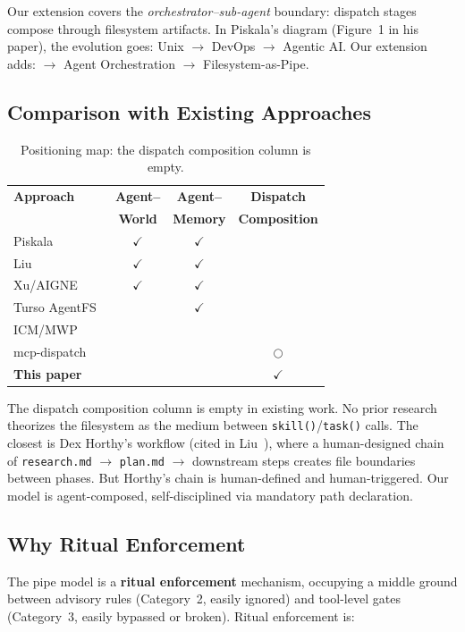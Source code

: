 \documentclass[11pt,a4paper]{article}
\begin{document}
Our extension covers the \emph{orchestrator--sub-agent} boundary: dispatch stages compose through filesystem artifacts. In Piskala's diagram (Figure~1 in his paper), the evolution goes: Unix $\to$ DevOps $\to$ Agentic AI. Our extension adds: $\to$ Agent Orchestration $\to$ Filesystem-as-Pipe.

\subsection{Comparison with Existing Approaches}
\begin{table}[h]
\centering
\begin{tabular}{lccc}
\toprule
\textbf{Approach} & \textbf{Agent--} & \textbf{Agent--} & \textbf{Dispatch} \\
 & \textbf{World} & \textbf{Memory} & \textbf{Composition} \\
\midrule
Piskala~\cite{piskala2026} & $\checkmark$ & $\checkmark$ & \\
Liu~\cite{liu2026} & $\checkmark$ & $\checkmark$ & \\
Xu/AIGNE~\cite{xu2025} & $\checkmark$ & $\checkmark$ & \\
Turso AgentFS~\cite{turso2025} & & $\checkmark$ & \\
ICM/MWP~\cite{vanclief2026} & & & \\
mcp-dispatch~\cite{sophia2026} & & & $\bigcirc$ \\
\textbf{This paper} & & & $\checkmark$ \\
\bottomrule
\end{tabular}
\caption{Positioning map: the dispatch composition column is empty.}
\label{tab:positioning}
\end{table}

The dispatch composition column is empty in existing work. No prior research theorizes the filesystem as the medium between \texttt{skill()}/\texttt{task()} calls. The closest is Dex Horthy's workflow (cited in Liu~\cite{liu2026}), where a human-designed chain of \texttt{research.md} $\to$ \texttt{plan.md} $\to$ downstream steps creates file boundaries between phases. But Horthy's chain is human-defined and human-triggered. Our model is agent-composed, self-disciplined via mandatory path declaration.

\subsection{Why Ritual Enforcement}
The pipe model is a \textbf{ritual enforcement} mechanism, occupying a middle ground between advisory rules (Category~2, easily ignored) and tool-level gates (Category~3, easily bypassed or broken). Ritual enforcement is:
\end{document}
